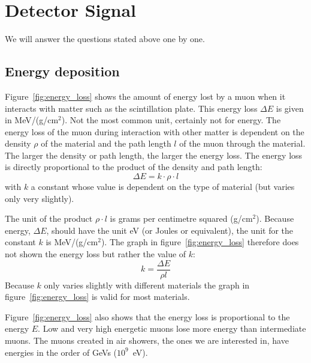 \documentclass[12pt,a4paper]{article}
\numberwithin{equation}{section}
\numberwithin{figure}{section}
\numberwithin{table}{section}
\begin{document}
\section{Detector Signal}
We will answer the questions stated above one by one.
\subsection{Energy deposition}
Figure~\ref{fig:energy_loss} shows the amount of energy lost by a muon when it interacts with matter such as the scintillation plate. This energy loss $\Delta E$ is given in MeV/(g/cm$^2$). Not the most common unit, certainly not for energy. The energy loss of the muon during interaction with other matter is dependent on the density $\rho$ of the material and the path length $l$ of the muon through the material. The larger the density or path length, the larger the energy loss. The energy loss is directly proportional to the product of the density and path length:
\begin{equation}
\Delta E = k \cdot \rho \cdot l
\end{equation}
with $k$ a constant whose value is dependent on the type of material (but varies only very slightly).

The unit of the product $\rho \cdot l$ is grams per centimetre squared (g/cm$^2$). Because energy, $\Delta E$, should have the unit eV (or Joules or equivalent), the unit for the constant $k$ is MeV/(g/cm$^2$). The graph in figure~\ref{fig:energy_loss} therefore does not shown the energy loss but rather the value of $k$:
\begin{equation}
k = \frac{\Delta E}{\rho l }
\end{equation}
Because $k$ only varies slightly with different materials the graph in figure~\ref{fig:energy_loss} is valid for most materials.

Figure~\ref{fig:energy_loss} also shows that the energy loss is proportional to the energy $E$. Low and very high energetic muons lose more energy than intermediate muons. The muons created in air showers, the ones we are interested in, have energies in the order of GeVs ($10^9$~eV).
\end{document}
